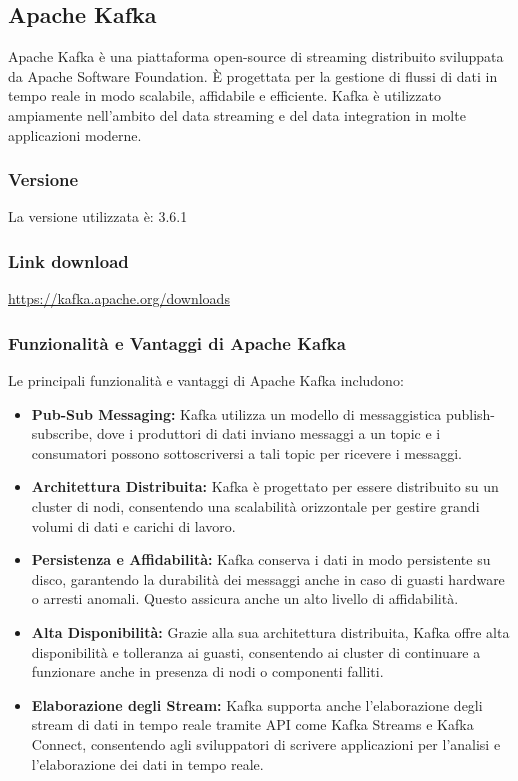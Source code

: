 \subsection{Apache Kafka}

Apache Kafka è una piattaforma open-source di streaming distribuito sviluppata da Apache Software Foundation. È progettata per la gestione di flussi di dati in tempo reale in modo scalabile, affidabile e efficiente. Kafka è utilizzato ampiamente nell'ambito del data streaming e del data integration in molte applicazioni moderne.
\subsubsection{Versione}
La versione utilizzata è: 3.6.1
\subsubsection{Link download}
\href{https://kafka.apache.org/downloads}{https://kafka.apache.org/downloads}

\subsubsection*{Funzionalità e Vantaggi di Apache Kafka}
Le principali funzionalità e vantaggi di Apache Kafka includono:

\begin{itemize}
  \item \textbf{Pub-Sub Messaging:} Kafka utilizza un modello di messaggistica publish-subscribe, dove i produttori di dati inviano messaggi a un topic e i consumatori possono sottoscriversi a tali topic per ricevere i messaggi.
  
  \item \textbf{Architettura Distribuita:} Kafka è progettato per essere distribuito su un cluster di nodi, consentendo una scalabilità orizzontale per gestire grandi volumi di dati e carichi di lavoro.
  
  \item \textbf{Persistenza e Affidabilità:} Kafka conserva i dati in modo persistente su disco, garantendo la durabilità dei messaggi anche in caso di guasti hardware o arresti anomali. Questo assicura anche un alto livello di affidabilità.
  
  \item \textbf{Alta Disponibilità:} Grazie alla sua architettura distribuita, Kafka offre alta disponibilità e tolleranza ai guasti, consentendo ai cluster di continuare a funzionare anche in presenza di nodi o componenti falliti.
  
  \item \textbf{Elaborazione degli Stream:} Kafka supporta anche l'elaborazione degli stream di dati in tempo reale tramite API come Kafka Streams e Kafka Connect, consentendo agli sviluppatori di scrivere applicazioni per l'analisi e l'elaborazione dei dati in tempo reale.
\end{itemize}

